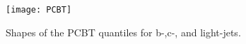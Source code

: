 \begin{figure}[!htbp]
  \centering
  \texttt{[image: PCBT]}
  \caption{Shapes of the PCBT quantiles for b-,c-, and light-jets.}
  \label{fig:PCBT_quant}
\end{figure}